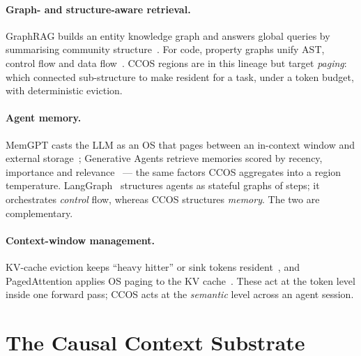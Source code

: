 \documentclass[11pt]{article}
\begin{document}
\paragraph{Graph- and structure-aware retrieval.} GraphRAG builds an entity
knowledge graph and answers global queries by summarising community
structure~\cite{edge2024graphrag}. For code, property graphs unify AST, control
flow and data flow~\cite{yamaguchi2014cpg}. CCOS regions are in this lineage but
target \emph{paging}: which connected sub-structure to make resident for a task,
under a token budget, with deterministic eviction.

\paragraph{Agent memory.} MemGPT casts the LLM as an OS that pages between an
in-context window and external storage~\cite{packer2023memgpt}; Generative Agents
retrieve memories scored by recency, importance and
relevance~\cite{park2023generative} --- the same factors CCOS aggregates into a
region temperature. LangGraph~\cite{langgraph} structures agents as stateful
graphs of steps; it orchestrates \emph{control} flow, whereas CCOS structures
\emph{memory}. The two are complementary.

\paragraph{Context-window management.} KV-cache eviction keeps ``heavy hitter''
or sink tokens resident~\cite{liu2023lost}, and PagedAttention applies OS paging
to the KV cache~\cite{kwon2023paged}. These act at the token level inside one
forward pass; CCOS acts at the \emph{semantic} level across an agent session.

\section{The Causal Context Substrate}\label{sec:substrate}
\end{document}
